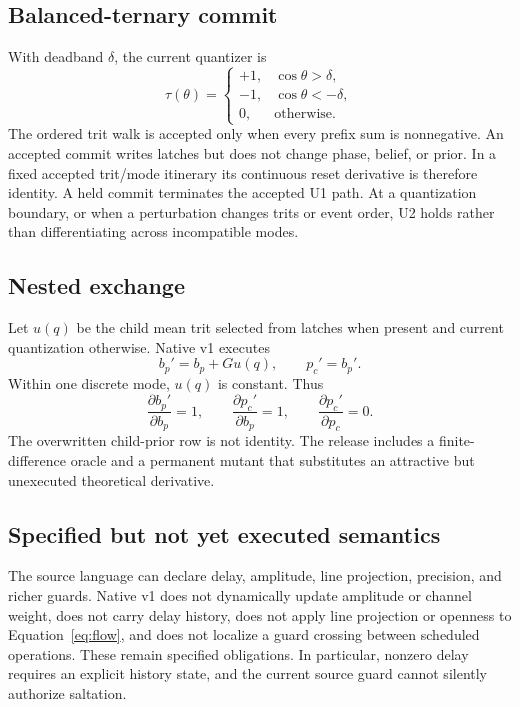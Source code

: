 \documentclass[11pt]{article}
\begin{document}
\subsection{Balanced-ternary commit}

With deadband $\delta$, the current quantizer is
\begin{equation}
\tau(\theta)=
\begin{cases}
+1,&\cos\theta>\delta,\\
-1,&\cos\theta<-\delta,\\
0,&\text{otherwise}.
\end{cases}
\label{eq:trit}
\end{equation}
The ordered trit walk is accepted only when every prefix sum is nonnegative. An
accepted commit writes latches but does not change phase, belief, or prior. In a
fixed accepted trit/mode itinerary its continuous reset derivative is therefore
identity. A held commit terminates the accepted U1 path. At a quantization
boundary, or when a perturbation changes trits or event order, U2 holds rather
than differentiating across incompatible modes.

\subsection{Nested exchange}

Let $u(q)$ be the child mean trit selected from latches when present and current
quantization otherwise. Native v1 executes
\begin{equation}
b_p'=b_p+G u(q),\qquad p_c'=b_p'.
\label{eq:nest}
\end{equation}
Within one discrete mode, $u(q)$ is constant. Thus
\[
\frac{\partial b_p'}{\partial b_p}=1,\qquad
\frac{\partial p_c'}{\partial b_p}=1,\qquad
\frac{\partial p_c'}{\partial p_c}=0.
\]
The overwritten child-prior row is not identity. The release includes a
finite-difference oracle and a permanent mutant that substitutes an attractive
but unexecuted theoretical derivative.

\subsection{Specified but not yet executed semantics}

The source language can declare delay, amplitude, line projection, precision,
and richer guards. Native v1 does not dynamically update amplitude or channel
weight, does not carry delay history, does not apply line projection or openness
to Equation~\eqref{eq:flow}, and does not localize a guard crossing between
scheduled operations. These remain specified obligations. In particular,
nonzero delay requires an explicit history state, and the current source guard
cannot silently authorize saltation.
\end{document}
